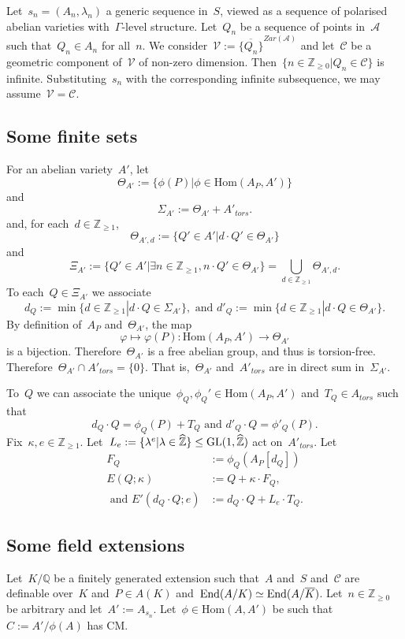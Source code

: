 \documentclass[12pt]{amsart}
\newcommand{\Hom}{\mbox{Hom}}
\newcommand{\End}{{\rm End}}
\newcommand{\GL}{{\rm GL}}
\newcommand{\Z}{{\mathbb Z}}
\newcommand{\Q}{{\mathbb Q}}
\newcommand{\ol}{\overline}
\newcommand{\wh}{\widehat}
\begin{document}
Let~$s_n=(A_n,\lambda_n)$ a generic sequence in~$S$, viewed as a sequence of polarised abelian varieties with~$\Gamma$-level structure. Let~$Q_n$ be a sequence of points in~$\mathcal{A}$ such that~$Q_n\in A_n$ for all~$n$. We consider~$\mathcal{V}:=\ol{\{Q_n\}}^{Zar(\mathcal{A})}$ and let~$\mathcal{C}$ be a geometric component of~$\mathcal{V}$ of non-zero dimension. Then~$\{n\in\Z_{\geq0}|Q_n\in \mathcal{C}\}$ is infinite.
Substituting~$s_n$ with the corresponding infinite subsequence, we may assume~$\mathcal{V}=\mathcal{C}$.

\subsection{Some finite sets}
For an abelian variety~$A'$, let
\[
\Theta_{A'}:=\{\phi(P)|\phi\in \Hom(A_P,A')\}
\]
and
\[
\Sigma_{A'}:=
\Theta_{A'}+A'_{tors}.
\]
and, for each~$d\in\Z_{\geq1}$,
\[
\Theta_{A',d}:=
\{Q'\in A'|d\cdot Q'\in \Theta_{A'}\}
\]
and
\[
\Xi_{A'}:=\{Q'\in A'|\exists n\in\Z_{\geq1}, n\cdot Q'\in \Theta_{A'}\}=\bigcup_{d\in\Z_{\geq1}}\Theta_{A',d}.
\] 
To each~$Q\in\Xi_{A'}$ we associate
\[
d_Q:=\min\{d\in\Z_{\geq1}|d\cdot Q\in \Sigma_{A'}\},\text{ and }
d'_Q:=\min\{d\in\Z_{\geq1}|d\cdot Q\in \Theta_{A'}\}.
\]
By definition of~$A_P$ and~$\Theta_{A'}$, the map
\[
\varphi\mapsto \varphi(P):\Hom(A_P,A')\to \Theta_{A'}
\]
is a bijection. Therefore~$\Theta_{A'}$ is a free abelian group, and thus is torsion-free.
 Therefore~$\Theta_{A'}\cap A'_{tors}=\{0\}$. That is,~$\Theta_{A'}$ and~$A'_{tors}$
are in direct sum in~$\Sigma_{A'}$.

To~$Q$ we can associate the unique~$\phi_Q,\phi_Q'\in\Hom(A_P,A')$ and~$T_Q\in A_{tors}$ such that
\[
d_Q\cdot Q=\phi_Q(P)+T_Q\text{ and }d'_Q\cdot Q=\phi'_Q(P).
\]
Fix~$\kappa,e\in\Z_{\geq1}$. 
Let~$L_e:=\{\lambda^e|\lambda\in \widehat{\Z}\}\leq \GL(1,\wh{\Z})$ act on~$A'_{tors}$. Let
\begin{align}\label{eq:def E Eprime}
F_Q&:=\phi_Q(A_P[d_Q])\\
\label{def:E Q kappa}
E(Q;\kappa)&:=Q+\kappa\cdot F_Q,\\
\label{def:E Q e}
\text{ and }
E'(d_Q\cdot Q;e)&:=d_Q\cdot Q+L_e\cdot T_Q.
\end{align}

\subsection{Some field extensions} Let~$K/\Q$ be a finitely generated extension such that~$A$ and~$S$ and~$\mathcal{C}$ are definable over~$K$ and~$P\in A(K)$ and~$\End(A/K)\simeq \End(A/\ol{K})$. Let~$n\in\Z_{\geq0}$ be arbitrary and let~$A':=A_{s_n}$. Let~$\phi\in\Hom(A,A')$ be such that~$C:=A'/\phi(A)$ has CM. 
\end{document}

